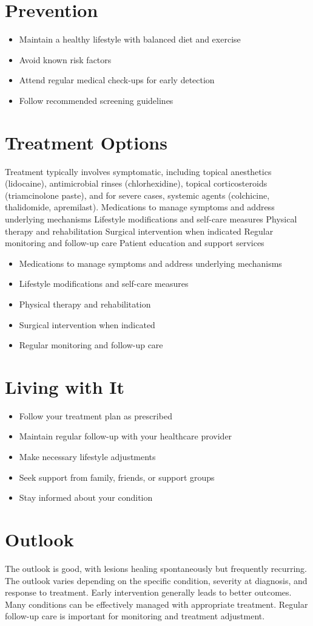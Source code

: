 \section{Prevention}
\begin{itemize}[noitemsep]
  \item Maintain a healthy lifestyle with balanced diet and exercise
  \item Avoid known risk factors
  \item Attend regular medical check-ups for early detection
  \item Follow recommended screening guidelines
\end{itemize}
\section{Treatment Options}
Treatment typically involves symptomatic, including topical anesthetics (lidocaine), antimicrobial rinses (chlorhexidine), topical corticosteroids (triamcinolone paste), and for severe cases, systemic agents (colchicine, thalidomide, apremilast). Medications to manage symptoms and address underlying mechanisms Lifestyle modifications and self-care measures Physical therapy and rehabilitation Surgical intervention when indicated Regular monitoring and follow-up care Patient education and support services

\begin{itemize}[noitemsep]
  \item Medications to manage symptoms and address underlying mechanisms
  \item Lifestyle modifications and self-care measures
  \item Physical therapy and rehabilitation
  \item Surgical intervention when indicated
  \item Regular monitoring and follow-up care
\end{itemize}
\section{Living with It}
\begin{itemize}[noitemsep]
  \item Follow your treatment plan as prescribed
  \item Maintain regular follow-up with your healthcare provider
  \item Make necessary lifestyle adjustments
  \item Seek support from family, friends, or support groups
  \item Stay informed about your condition
\end{itemize}
\section{Outlook}
The outlook is good, with lesions healing spontaneously but frequently recurring. The outlook varies depending on the specific condition, severity at diagnosis, and response to treatment. Early intervention generally leads to better outcomes. Many conditions can be effectively managed with appropriate treatment. Regular follow-up care is important for monitoring and treatment adjustment.

